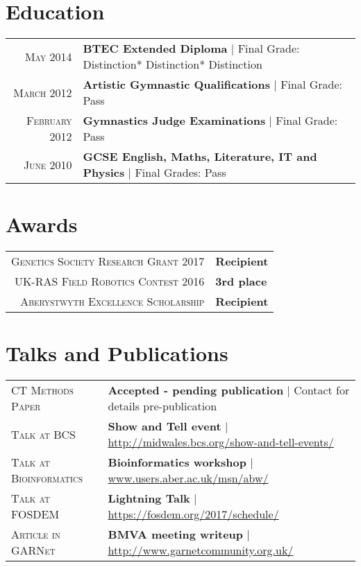 \documentclass[a4paper,9pt]{article}
\begin{document}
\section{Education}
\begin{tabular}{rl}	
  \textsc{May} 2014& \textbf{BTEC Extended Diploma} | Final Grade: Distinction* Distinction* Distinction
  \\
  \textsc{March} 2012& \textbf{Artistic Gymnastic Qualifications} | Final Grade: Pass
  \\
  \textsc{February} 2012& \textbf{Gymnastics Judge Examinations} | Final Grade: Pass
  \\
  \textsc{June} 2010& \textbf{GCSE English, Maths, Literature, IT and Physics} | Final Grades: Pass
\end{tabular}


\section{Awards}
\begin{tabular}{rl}	
  \textsc{Genetics Society Research Grant 2017}& \textbf{Recipient}
  \\
  \textsc{UK-RAS Field Robotics Contest 2016}& \textbf{3rd place}
  \\
  \textsc{Aberystwyth Excellence Scholarship}& \textbf{Recipient}
\end{tabular}


\section{Talks and Publications}
\begin{tabular}{ll}	
  \textsc{CT Methods Paper} & \textbf{Accepted - pending publication} | Contact for details pre-publication\\
  \textsc{Talk at BCS} & \textbf{Show and Tell event} | \href{http://www.midwales.bcs.org/show-and-tell-events/}{http://midwales.bcs.org/show-and-tell-events/}\\
  \textsc{Talk at Bioinformatics} & \textbf{Bioinformatics workshop} | \href{www.users.aber.ac.uk/msn/abw/index.html}{www.users.aber.ac.uk/msn/abw/} \\
  \textsc{Talk at FOSDEM} & \textbf{Lightning Talk} | \href{https://fosdem.org/2017/schedule/}{https://fosdem.org/2017/schedule/}\\
  \textsc{Article in GARNet} & \textbf{BMVA meeting writeup} | \href{http://www.garnetcommunity.org.uk}{http://www.garnetcommunity.org.uk/} 
\end{tabular}
\end{document}
